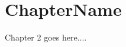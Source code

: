 \documentclass{standalone}
\begin{document}
\chapter{ChapterName}
Chapter 2 goes here....
\end{document}
